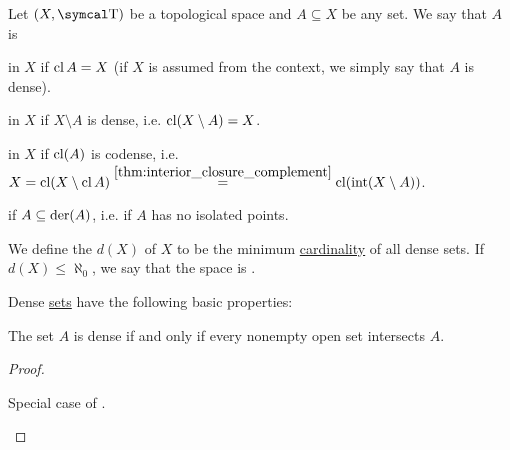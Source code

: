 \begin{definition}\label{def:topologically_dense_set}\cite[25]{Engelking1989}
  Let \( (X, \CT) \) be a topological space and \( A \subseteq X \) be any set. We say that \( A \) is

  \begin{defenum}
      in \( X \) if \( \operatorname{cl}{A} = X \) (if \( X \) is assumed from the context, we simply say that \( A \) is dense).

      in \( X \) if \( X \setminus A \) is dense, i.e. \( \operatorname{cl}(X \setminus A) = X \).

      in \( X \) if \( \operatorname{cl}(A) \) is codense, i.e. \( X = \operatorname{cl}(X \setminus \operatorname{cl} A) \overset {\ref{thm:interior_closure_complement}} = \operatorname{cl}(\operatorname{int}(X \setminus A)) \).

      if \( A \subseteq \operatorname{der}(A) \), i.e. if \( A \) has no isolated points.
  \end{defenum}

  We define the  \( d(X) \) of \( X \) to be the minimum \hyperref[def:cardinal]{cardinality} of all dense sets. If \( d(X) \leq \aleph_0 \), we say that the space is .
\end{definition}

\begin{proposition}\label{thm:dense_set_properties}
  Dense \hyperref[def:topologically_dense_set/dense]{sets} have the following basic properties:
  \begin{propenum}
    \cite[proposition 1.3.5]{Engelking1989} The set \( A \) is dense if and only if every nonempty open set intersects \( A \).
  \end{propenum}
\end{proposition}
\begin{proof}\mbox{}
  \begin{description}
     Special case of .
  \end{description}
\end{proof}

